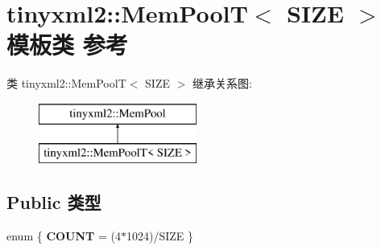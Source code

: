 \hypertarget{classtinyxml2_1_1_mem_pool_t}{}\section{tinyxml2\+:\+:Mem\+PoolT$<$ S\+I\+ZE $>$ 模板类 参考}
\label{classtinyxml2_1_1_mem_pool_t}
类 tinyxml2\+:\+:Mem\+PoolT$<$ S\+I\+ZE $>$ 继承关系图\+:\begin{figure}[H]
\begin{center}
\leavevmode
\includegraphics[height=2.000000cm]{classtinyxml2_1_1_mem_pool_t}
\end{center}
\end{figure}
\subsection*{Public 类型}
\begin{DoxyCompactItemize}
\item 
\mbox{\label{classtinyxml2_1_1_mem_pool_t_ac7c490bfaa0e8fca243702a85e776f85}} 
enum \{ {\bfseries C\+O\+U\+NT} = (4$\ast$1024)/\+S\+I\+ZE
 \}
\end{DoxyCompactItemize}
